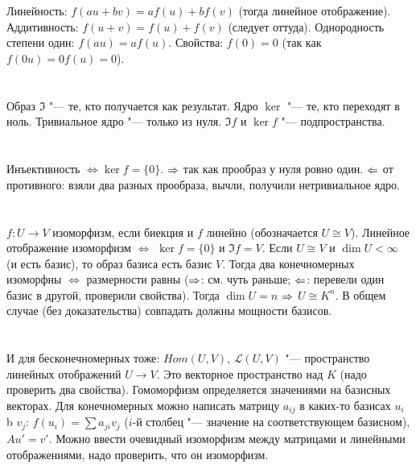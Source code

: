 \section{} %
Линейность: $f(au+bv)=af(u)+bf(v)$ (тогда линейное отображение).
Аддитивность: $f(u+v)=f(u)+f(v)$ (следует оттуда).
Однородность степени один: $f(au)=af(u)$.
Свойства: $f(0)=0$ (так как $f(0u)=0f(u)=0$).

\section{} %
Образ $\Im$ "--- те, кто получается как результат.
Ядро $\ker$ "--- те, кто переходят в ноль.
Тривиальное ядро "--- только из нуля.
$\Im f$ и $\ker f$ "--- подпространства.

\section{} %
Инъективность $\iff \ker f = \{0\}$.
$\Rightarrow$ так как прообраз у нуля ровно один.
$\Leftarrow$ от противного: взяли два разных прообраза, вычли, получили нетривиальное ядро.

\section{} %
$f \colon U \to V$ изоморфизм, если биекция и $f$ линейно (обозначается $U \cong V$).
Линейное отображение изоморфизм $\iff$ $\ker f = \{0\}$ и $\Im f = V$.
Если $U \cong V$ и $\dim U < \infty$ (и есть базис), то образ базиса есть базис $V$.
Тогда два конечномерных изоморфны $\iff$ размерности равны ($\Rightarrow$: см. чуть раньше; $\Leftarrow$: перевели один базис в другой, проверили свойства).
Тогда $\dim U = n$ $\Rightarrow$ $U \cong K^n$.
В общем случае (без доказательства) совпадать должны мощности базисов.

\section{} %
И для бесконечномерных тоже:
$Hom(U, V)$, $\mathcal{L}(U, V)$ "--- пространство линейных отображений $U \to V$.
Это векторное пространство над $K$ (надо проверить два свойства).
Гомоморфизм определяется значениями на базисных векторах.
Для конечномерных можно написать матрицу $a_{ij}$ в каких-то базисах $u_i$ b $v_j$: $f(u_i) = \sum a_{ji} v_j$ ($i$-й столбец "--- значение на соответствующем базисном), $Au' = v'$.
Можно ввести очевидный изоморфизм между матрицами и линейными отображениями, надо проверить, что он изоморфизм.

